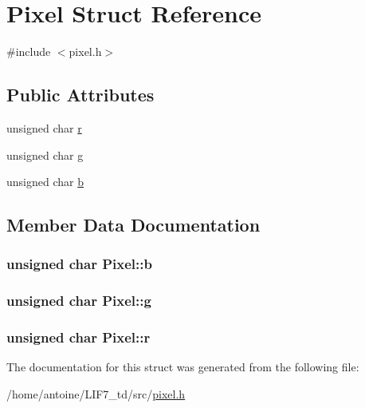 \hypertarget{structPixel}{\section{Pixel Struct Reference}
\label{structPixel}
}


{\ttfamily \#include $<$pixel.\-h$>$}

\subsection*{Public Attributes}
\begin{DoxyCompactItemize}
\item 
unsigned char \hyperlink{structPixel_a038ad5b3349e7548d17c5d3bec511b94}{r}
\item 
unsigned char \hyperlink{structPixel_a8407845aacf1663d9463475619911686}{g}
\item 
unsigned char \hyperlink{structPixel_a760bdf29b15433d257f119239fcff4d4}{b}
\end{DoxyCompactItemize}


\subsection{Member Data Documentation}
\hypertarget{structPixel_a760bdf29b15433d257f119239fcff4d4}{
\subsubsection[{b}]{\setlength{\rightskip}{0pt plus 5cm}unsigned char Pixel\-::b}}\label{structPixel_a760bdf29b15433d257f119239fcff4d4}
\hypertarget{structPixel_a8407845aacf1663d9463475619911686}{
\subsubsection[{g}]{\setlength{\rightskip}{0pt plus 5cm}unsigned char Pixel\-::g}}\label{structPixel_a8407845aacf1663d9463475619911686}
\hypertarget{structPixel_a038ad5b3349e7548d17c5d3bec511b94}{
\subsubsection[{r}]{\setlength{\rightskip}{0pt plus 5cm}unsigned char Pixel\-::r}}\label{structPixel_a038ad5b3349e7548d17c5d3bec511b94}


The documentation for this struct was generated from the following file\-:\begin{DoxyCompactItemize}
\item 
/home/antoine/\-L\-I\-F7\-\_\-td/src/\hyperlink{pixel_8h}{pixel.\-h}\end{DoxyCompactItemize}
